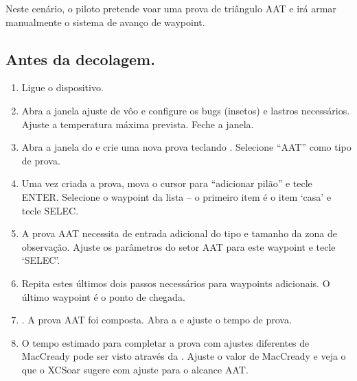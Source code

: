 Neste cenário, o piloto pretende voar uma prova de triângulo AAT e irá armar manualmente o sistema de avanço de waypoint.


\subsection*{Antes da decolagem.}
\begin{enumerate}
\item  Ligue o dispositivo.
\item  Abra a janela ajuste de vôo e configure os bugs (insetos) e lastros necessários.  Ajuste a temperatura máxima prevista.  Feche a janela.
\item Abra a janela do e crie uma nova prova teclando . Selecione “AAT” como tipo de prova.
\item  Uma vez criada a prova, mova o cursor para “adicionar pilão” e tecle ENTER.  Selecione o waypoint da lista – o primeiro item é o item ‘casa’ e tecle SELEC.  
\item  A prova AAT necessita de entrada adicional do tipo e tamanho da zona de observação.  Ajuste os parâmetros do setor AAT para este waypoint e tecle ‘SELEC’.
\item  Repita estes últimos dois passos necessários para waypoints adicionais.  O último waypoint é o ponto de chegada.
\item  .  A prova AAT foi composta.  Abra a   e ajuste o tempo de prova.
\item  O tempo estimado para completar a prova com ajustes diferentes de MacCready pode ser visto através da  .  Ajuste o valor de MacCready e veja o que o XCSoar sugere com ajuste para o alcance AAT.
\end{enumerate}

